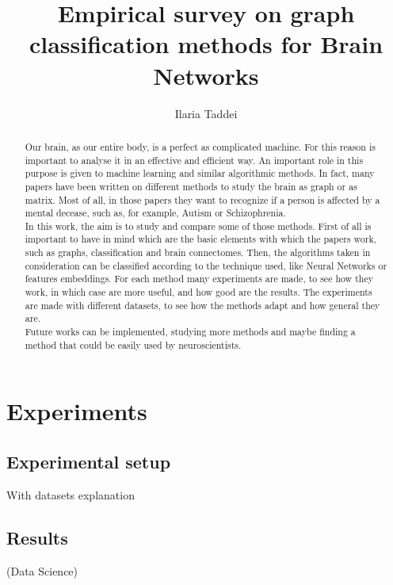 \documentclass[english, Lau, oneside]{sapthesis}%
\title{Empirical survey on graph classification methods for Brain Networks}
\author{Ilaria Taddei}
\begin{document}
\frontmatter
\maketitle

\begin{abstract}
Our brain, as our entire body, is a perfect as complicated machine. For this reason is important to analyse it in an effective and efficient way. An important role in this purpose is given to machine learning and similar algorithmic methods. In fact, many papers have been written on different methods to study the brain as graph or as matrix. Most of all, in those papers they want to recognize if a person is affected by a mental decease, such as, for example, Autism or Schizophrenia.  \\
In this work, the aim is to study and compare some of those methods. First of all is important to have in mind which are the basic elements with which the papers work, such as graphs, classification and brain connectomes. Then, the algorithms taken in consideration can be classified according to the technique used, like Neural Networks or features embeddings. For each method many experiments are made, to see how they work, in which case are more useful, and how good are the results. The experiments are made with different datasets, to see how the methods adapt and how general they are. \\
Future works can be implemented, studying more methods and maybe finding a method that could be easily used by neuroscientists. 
\end{abstract}

\tableofcontents

\mainmatter







\chapter{Experiments}
\label{chap:2}
\section{Experimental setup}
With datasets explanation

\section{Results}
(Data Science)
\end{document}

